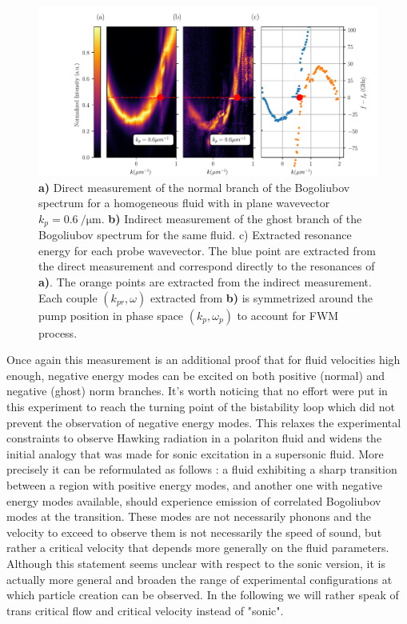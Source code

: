 \begin{figure}
    \centering
    \includegraphics[width=1\textwidth]{chap_custom_st/fig/supersonic_homogenous.pdf}
    \caption{\textbf{a)} Direct measurement of the normal branch of the Bogoliubov spectrum for a homogeneous fluid with in plane wavevector $k_p=\SI{0.6}{\per \micro \meter}.$ \textbf{\textbf{b)}} Indirect measurement of the ghost branch of the Bogoliubov spectrum for the same fluid.
    c) Extracted resonance energy for each probe wavevector. The blue point are extracted from the direct measurement and correspond directly to the resonances of \textbf{a)}. The orange points are extracted from the indirect measurement. Each couple $(k_{pr}, \omega)$ extracted from \textbf{b)} is symmetrized around the pump position in phase space $(k_p, \omega_p)$ to account for FWM process.}
    \label{fig:homogeneous_fluid_bogo_ghost}

\end{figure}

Once again this measurement is an additional proof that for fluid velocities high enough, negative energy modes can be excited on both positive (normal) and negative (ghost) norm branches.
It's worth noticing that no effort were put in this experiment to reach the turning point of the bistability loop which did not prevent the observation of negative energy modes. This relaxes 
the experimental constraints to observe Hawking radiation in a polariton fluid and widens the initial analogy that was made for sonic excitation in a supersonic fluid. More precisely it can be reformulated as follows :
a fluid exhibiting a sharp transition between a region with positive energy modes, and another one with negative energy modes available, should experience  emission of correlated Bogoliubov modes at the transition.
These modes are not necessarily phonons and the velocity to exceed to observe them is not necessarily the speed of sound, but rather a critical velocity that depends more generally on the fluid parameters.
Although this statement seems unclear with respect to the sonic version, it is actually more general and broaden the range of experimental configurations at which particle creation can be observed. In the following 
we will rather speak of trans critical flow and critical velocity instead of "sonic".






